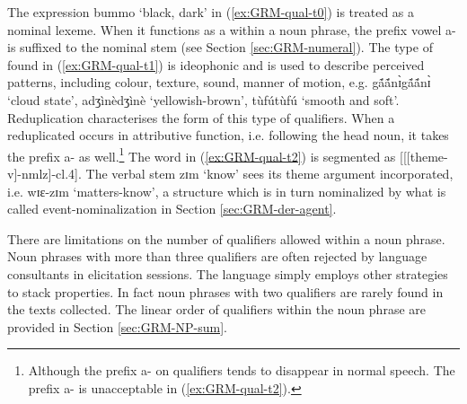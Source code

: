 \begin{exe}
\begin{exe}
\begin{exe}
\begin{exe}
\begin{exe}
\begin{exe}
\begin{exe}
\begin{exe}
\begin{exe}
The expression {\sls bummo} `black, dark'  in (\ref{ex:GRM-qual-t0}) is treated as a nominal lexeme. When it functions as a  within a noun phrase,  the prefix vowel {\sls a-} is suffixed to the nominal stem  (see Section \ref{sec:GRM-numeral}). The type of  found in (\ref{ex:GRM-qual-t1}) is ideophonic and is used to describe perceived patterns, including colour, texture, sound, manner of motion, e.g. {\sls gã́ã́nɪ̀gã́ã́nɪ̀} `cloud state',  {\sls adʒìnèdʒìnè} `yellowish-brown',  {\sls tùfútùfú} `smooth and soft'. Reduplication   characterises the form of this type of qualifiers. When a reduplicated  occurs in attributive function, i.e. following the head noun, it takes the prefix {\sls a-} as well.\footnote{Although the prefix {\sls a-} on qualifiers tends to disappear in normal speech. The prefix {\sls a-} is unacceptable in (\ref{ex:GRM-qual-t2}).} The word in (\ref{ex:GRM-qual-t2}) is segmented as [[[{\sc theme}-v]-{\sc nmlz}]-{\sc cl.4}]. The verbal stem {\sls zɪm} `know'   sees  its theme argument incorporated, i.e.  {\sls wɪɛ-zɪm} `matters-know',  a structure which is in turn nominalized by what is called  event-nominalization in Section \ref{sec:GRM-der-agent}.  


There are  limitations on the number of qualifiers allowed within a noun phrase. Noun phrases with more than three qualifiers are often rejected by language consultants in elicitation sessions.  The language simply employs other strategies to stack properties. In fact noun phrases with two qualifiers are rarely found in the texts collected. The linear order of qualifiers within the noun phrase are provided in Section \ref{sec:GRM-NP-sum}.


\end{exe}
\end{exe}
\end{exe}
\end{exe}
\end{exe}
\end{exe}
\end{exe}
\end{exe}
\end{exe}
